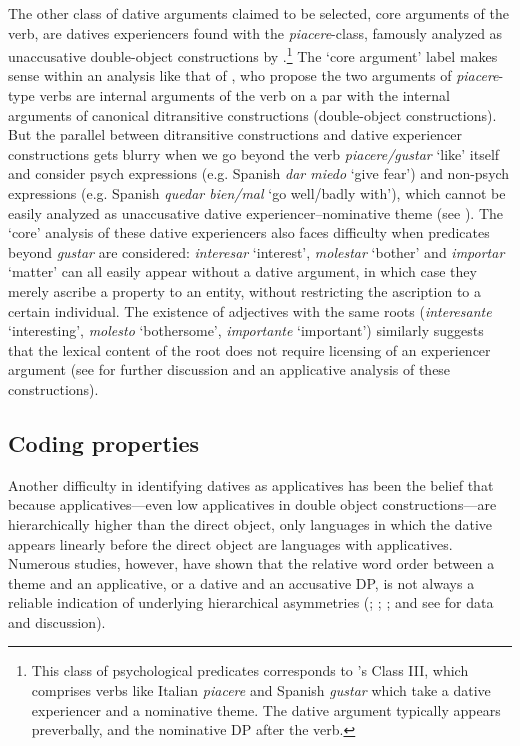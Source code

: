 \documentclass[output=paper,colorlinks,citecolor=brown,nonflat]{./langscibook}
\begin{document}
The other class of dative arguments claimed to be selected, core arguments of the verb, are datives experiencers found with the \textit{piacere}-class, famously analyzed as unaccusative double-object constructions by \citealt{BellettiRizzi1988}.\footnote{This class of psychological predicates corresponds to \citeauthor{BellettiRizzi1988}’s Class III, which comprises verbs like Italian \textit{piacere} and Spanish \textit{gustar} which take a dative experiencer and a nominative theme. The dative argument typically appears preverbally, and the nominative DP after the verb.}  The ‘core argument’ label makes sense within an analysis like that of \citeauthor{BellettiRizzi1988}, who propose the two arguments of \textit{piacere}-type verbs are internal arguments of the verb on a par with the internal arguments of canonical ditransitive constructions (double-object constructions).  But the parallel between ditransitive constructions and dative experiencer constructions gets blurry when we go beyond the verb \textit{piacere/gustar} ‘like’ itself and consider psych expressions (e.g. Spanish \textit{dar miedo} ‘give fear’) and non-psych expressions (e.g. Spanish \textit{quedar bien/mal} ‘go well/badly with’), which cannot be easily analyzed as unaccusative dative experiencer–nominative theme (see \citealt{Cuervo2011}). The ‘core’ analysis of these dative experiencers also faces difficulty when predicates beyond \textit{gustar} are considered: \textit{interesar} ‘interest’, \textit{molestar} ‘bother’ and \textit{importar} ‘matter’ can all easily appear without a dative argument, in which case they merely ascribe a property to an entity, without restricting the ascription to a certain individual. The existence of adjectives with the same roots (\textit{interesante} ‘interesting’, \textit{molesto} ‘bothersome’, \textit{importante} ‘important’) similarly suggests that the lexical content of the root does not require licensing of an experiencer argument (see  for further discussion and an applicative analysis of these constructions).

\subsection{Coding properties}\label{sec:cuervo:2.2}

Another difficulty in identifying datives as applicatives has been the belief that because applicatives—even low applicatives in double object constructions—are hierarchically higher than the direct object, only languages in which the dative appears linearly before the direct object are languages with applicatives. Numerous studies, however, have shown that the relative word order between a theme and an applicative, or a dative and an accusative DP, is not always a reliable indication of underlying hierarchical asymmetries (; ; \citealt{Cuervo2003, Demonte1995, MiyagawaTsujioka2004}; and see \citealt{McGinnis2018} for data and discussion).
\end{document}
